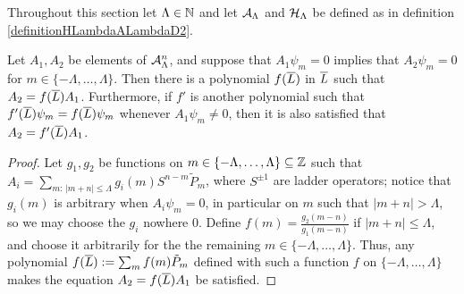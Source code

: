         
        
        
        



Throughout this section let $\Lambda \in \mathbb{N}$ and let $\mathcal A_\Lambda$ and $\mathcal H_\Lambda$ be defined as in definition \ref{definitionHLambdaALambdaD2}.

\begin{lemma}\label{lemmaExistsPolynomialInLTakingSameGradeToItD2}
Let $A_1, A_2$ be elements of $\mathcal A_\Lambda^n$, and suppose that $A_1 \psi_m = 0$ implies that $A_2\psi_m = 0$ for $m \in \{-\Lambda, \dots, \Lambda\}$.
Then there is a polynomial $f(\overline{L})$ in $\overline{L}$ such that $A_2 = f(\overline{L}) A_1$. Furthermore, if $f'$ is another polynomial such that $f'(\overline{L})\psi_m = f(\overline{L})\psi_m$ whenever $A_1 \psi_m \neq 0$, then it is also satisfied that $A_2 = f'(\overline{L}) A_1$.
\end{lemma}
\begin{proof}
Let $g_1, g_2$ be functions on $m \in \{-\Lambda, \dots, \Lambda\}\subseteq \mathbb{Z}$ such that $A_i = \sum_{m: \, |m+n| \leq \Lambda} g_i(m) S^{n-m} \tilde P_m$, where $S^{\pm 1}$ are ladder operators; notice that $g_i(m)$ is arbitrary when $A_i \psi_m = 0$, in particular on $m$ such that $|m+n| > \Lambda$, so we may choose the $g_i$ nowhere $0$. Define $f(m) = \frac{g_2(m-n)}{g_1(m-n)}$ if $|m+n| \leq \Lambda$, and choose it arbitrarily for the the remaining $m \in \{-\Lambda, \dots, \Lambda\}$. Thus, any polynomial $f(\overline{L}) := \sum_{m} f(m) \tilde P_m$ defined with such a function $f$ on $\{-\Lambda, \dots, \Lambda\}$ makes the equation $A_2 = f(\overline{L}) A_1$ be satisfied.
\end{proof}

